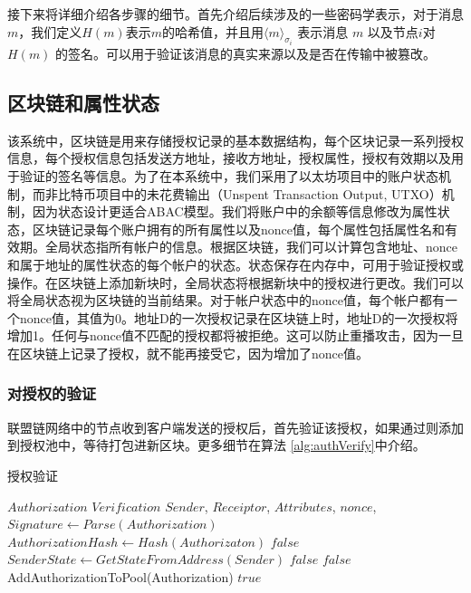 接下来将详细介绍各步骤的细节。首先介绍后续涉及的一些密码学表示，对于消息$m$，我们定义$H(m)$表示$m$的哈希值，并且用$\langle m \rangle_{\sigma_{i}}$ 表示消息 $m$ 以及节点$i$对 $H(m)$ 的签名。可以用于验证该消息的真实来源以及是否在传输中被篡改。

\subsection{区块链和属性状态}

该系统中，区块链是用来存储授权记录的基本数据结构，每个区块记录一系列授权信息，每个授权信息包括发送方地址，接收方地址，授权属性，授权有效期以及用于验证的签名等信息。为了在本系统中，我们采用了以太坊项目中的账户状态机制，而非比特币项目中的未花费输出（Unspent Transaction Output, UTXO）机制，因为状态设计更适合ABAC模型。我们将账户中的余额等信息修改为属性状态，区块链记录每个账户拥有的所有属性以及nonce值，每个属性包括属性名和有效期。全局状态指所有帐户的信息。根据区块链，我们可以计算包含地址、nonce和属于地址的属性状态的每个帐户的状态。状态保存在内存中，可用于验证授权或操作。在区块链上添加新块时，全局状态将根据新块中的授权进行更改。我们可以将全局状态视为区块链的当前结果。对于帐户状态中的nonce值，每个帐户都有一个nonce值，其值为0。地址D的一次授权记录在区块链上时，地址D的一次授权将增加1。任何与nonce值不匹配的授权都将被拒绝。这可以防止重播攻击，因为一旦在区块链上记录了授权，就不能再接受它，因为增加了nonce值。

\subsubsection{对授权的验证}

联盟链网络中的节点收到客户端发送的授权后，首先验证该授权，如果通过则添加到授权池中，等待打包进新区块。更多细节在算法 \ref{alg:authVerify}中介绍。

 \begin{algorithm}
 \caption{授权验证}\label{alg:authVerify}
   \begin{algorithmic}[!htbp]
   \renewcommand{\algorithmicrequire}{\textbf{Input:}}
   \renewcommand{\algorithmicensure}{\textbf{Output:}}
   \REQUIRE $Authorization$
   \ENSURE  $Verification$
    \STATE $Sender$, $Receiptor$, $Attributes$, $nonce$, $Signature \gets Parse(Authorization)$
    \STATE $AuthorizationHash \gets Hash(Authorizaton)$
      \RETURN $false$
    \ENDIF
    \STATE $SenderState \gets GetStateFromAddress(Sender)$
      \RETURN $false$
    \ENDIF
        \RETURN $false$
      \ENDIF
    \ENDFOR
    \STATE AddAuthorizationToPool(Authorization)
   \RETURN $true$
   \end{algorithmic}
 \end{algorithm}

